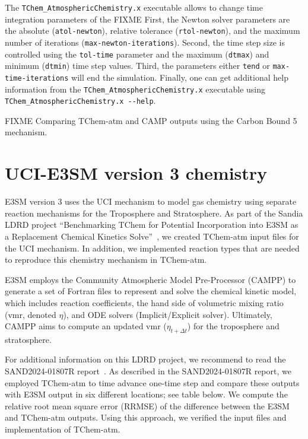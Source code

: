 \documentclass[report, 12pt]{SANDreport}
\begin{document}
The \verb|TChem_AtmosphericChemistry.x| executable allows to change time integration parameters of the 
FIXME 
 First, the Newton solver parameters are the
absolute (\verb|atol-newton|), relative tolerance (\verb|rtol-newton|), and the maximum number of iterations (\verb|max-newton-iterations|). Second, the time step size is controlled using the \verb|tol-time| parameter and the maximum (\verb|dtmax|) and minimum (\verb|dtmin|) time step values. Third, the parameters either \verb|tend| or \verb|max-time-iterations| will end the simulation. Finally, one can get additional help information from the \verb|TChem_AtmosphericChemistry.x| executable using \verb|TChem_AtmosphericChemistry.x --help|.


FIXME
Comparing TChem-atm and CAMP outputs using the Carbon Bound 5 mechanism.

\section{UCI-E3SM version 3 chemistry}

E3SM version 3 uses the UCI mechanism to model gas chemistry using separate reaction mechanisms for the Troposphere and Stratosphere. As part of the Sandia LDRD project ``Benchmarking TChem for Potential Incorporation into E3SM as a Replacement Chemical Kinetics Solve''~\cite{Diaz-Ibarra:2024:tchem}, we created TChem-atm input files for the UCI mechanism. In addition, we implemented reaction types that are needed to reproduce this chemistry mechanism in TChem-atm.

E3SM employs the Community Atmospheric Model Pre-Processor (CAMPP) to generate a set of Fortran files to represent and solve the chemical kinetic model, which includes reaction coefficients, the hand side of volumetric mixing ratio (vmr, denoted $\eta$), and ODE solvers (Implicit/Explicit solver). Ultimately, CAMPP aims to compute an updated vmr ($\eta_{t+\Delta t}$) for the troposphere and stratosphere.

For additional information on this LDRD project, we recommend to read the SAND2024-01807R report~\cite{Diaz-Ibarra:2024:tchem}. As described in the SAND2024-01807R report, we employed TChem-atm to time advance one-time step and compare these outputs with E3SM output in six different locations; see table below. We compute the relative root mean square error (RRMSE) of the difference between the E3SM and TChem-atm outputs. Using this approach, we verified the input files and implementation of TChem-atm.
\end{document}
